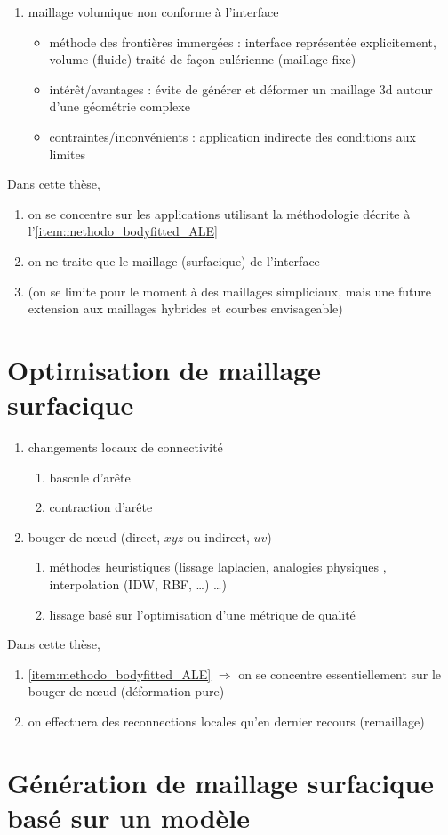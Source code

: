 \begin{enumerate}
	\item maillage volumique non conforme à l’interface
	\begin{itemize}
		\item méthode des frontières immergées \cite{peskin2002, hovnanian2012, wang2012} : interface représentée explicitement, volume (fluide) traité de façon eulérienne (\ie maillage fixe)
		\item intérêt/avantages : évite de générer et déformer un maillage 3d autour d’une géométrie complexe
		\item contraintes/inconvénients : application indirecte des conditions aux limites
	\end{itemize}
\end{enumerate}

Dans cette thèse,
\begin{enumerate}
	\item on se concentre sur les applications utilisant la méthodologie décrite à l'\autoref{item:methodo_bodyfitted_ALE}
	\item on ne traite que le maillage (surfacique) de l'interface
	\item (on se limite pour le moment à des maillages simpliciaux, mais une future extension aux maillages hybrides et courbes envisageable)
\end{enumerate}


\section{Optimisation de maillage surfacique}%
\begin{enumerate}
	\item changements locaux de connectivité
	\begin{enumerate}
		\item bascule d'arête
		\item contraction d'arête
	\end{enumerate}
	\item bouger de n\oe ud (direct, \ie $xyz$ ou indirect, \ie $uv$)
	\begin{enumerate}
		\item méthodes heuristiques (lissage laplacien, analogies physiques \cite{farhat1998}, interpolation (IDW, RBF, \ldots) \ldots)
		\item lissage basé sur l'optimisation d'une métrique de qualité \cite{freitag1995, canann1998, jiao2008, gargallo2014}
	\end{enumerate}
\end{enumerate}

Dans cette thèse,
\begin{enumerate}
	\item \autoref{item:methodo_bodyfitted_ALE} $\Rightarrow$ on se concentre essentiellement sur le bouger de n\oe ud (déformation pure)
	\item on effectuera des reconnections locales qu'en dernier recours (remaillage)
\end{enumerate}

\section{Génération de maillage surfacique basé sur un modèle \brep}
